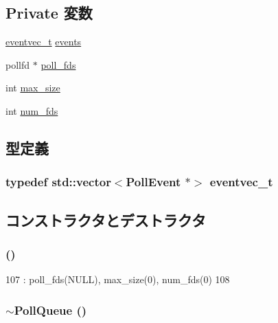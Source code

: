 \subsection*{Private 変数}
\begin{DoxyCompactItemize}
\item 
\hyperlink{classstd_1_1vector}{eventvec\_\-t} \hyperlink{classPollQueue_a0d7a0c13fa669886380eca2fe79bf0ad}{events}
\item 
pollfd $\ast$ \hyperlink{classPollQueue_aee8bf4d1604933fa62865d958c61a35c}{poll\_\-fds}
\item 
int \hyperlink{classPollQueue_a98ca8117bc73d9d7520727c4ce8772e6}{max\_\-size}
\item 
int \hyperlink{classPollQueue_a87fdf770430098f0bf2a4e540804aaf2}{num\_\-fds}
\end{DoxyCompactItemize}


\subsection{型定義}
\hypertarget{classPollQueue_a00fb40260dd4f32af4f844fc9f4dfcc0}{
\subsubsection[{eventvec\_\-t}]{\setlength{\rightskip}{0pt plus 5cm}typedef {\bf std::vector}$<${\bf PollEvent} $\ast$$>$ {\bf eventvec\_\-t}}}
\label{classPollQueue_a00fb40260dd4f32af4f844fc9f4dfcc0}


\subsection{コンストラクタとデストラクタ}
\hypertarget{classPollQueue_a70b9f304ac808c76af92b819c8a1f2b8}{
\subsubsection[{PollQueue}]{ ()}}
\label{classPollQueue_a70b9f304ac808c76af92b819c8a1f2b8}



\begin{DoxyCode}
107     : poll_fds(NULL), max_size(0), num_fds(0)
108 { }
\end{DoxyCode}
\hypertarget{classPollQueue_a39f4757a20213ab29760d486254dab55}{
\subsubsection[{$\sim$PollQueue}]{\setlength{\rightskip}{0pt plus 5cm}$\sim${\bf PollQueue} ()}}
\label{classPollQueue_a39f4757a20213ab29760d486254dab55}



